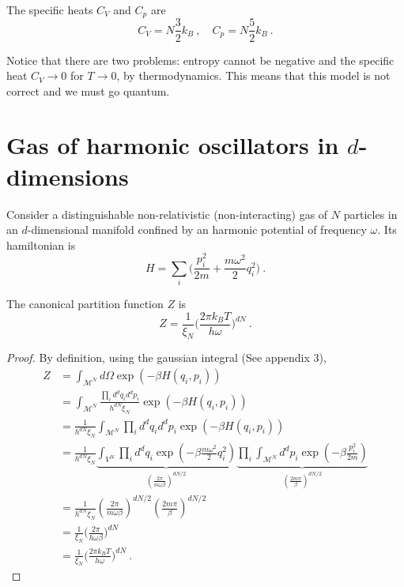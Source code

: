     The specific heats $C_V$ and $C_p$ are 
    \begin{equation*}
        C_V = N \frac{3}{2} k_B ~, \quad C_p = N \frac{5}{2} k_B ~. 
    \end{equation*}

    Notice that there are two problems: entropy cannot be negative and the specific heat $C_V \rightarrow 0$ for $T \rightarrow 0$, by thermodynamics. This means that this model is not correct and we must go quantum.
    
\section{Gas of harmonic oscillators in $d$-dimensions}

    Consider a distinguishable non-relativistic (non-interacting) gas of $N$ particles in an $d$-dimensional manifold confined by an harmonic potential of frequency $\omega$. Its hamiltonian is 
    \begin{equation*}
        H = \sum_i \Big ( \frac{p^2_i}{2m} + \frac{m \omega^2}{2} q_i^2 \Big ) ~.
    \end{equation*}

    The canonical partition function $Z$ is 
    \begin{equation*}
        Z = \frac{1}{\xi_N} \Big (\frac{2 \pi k_B T}{h \omega})^{dN} ~.
    \end{equation*}
    \begin{proof}
        By definition, using the gaussian integral (See appendix 3),
        \begin{equation*}
        \begin{aligned}
            Z & = \int_{\mathcal M^N} d\Omega \exp(- \beta H (q_i, p_i)) \\ & = \int_{\mathcal M^N} \frac{\prod_i d^d q_i d^d p_i}{h^{dN} \xi_N} \exp(- \beta H (q_i, p_i)) \\ & = \frac{1}{h^{dN} \xi_N} \int_{\mathcal M^N} \prod_i d^d q_i d^d p_i \exp(- \beta H (q_i, p_i)) \\ & = \frac{1}{h^{dN} \xi_N} \underbrace{\int_{ V^N} \prod_i d^d q_i \exp(- \beta \frac{m \omega^2}{2} q_i^2)}_{(\frac{2 \pi}{m \omega \beta})^{dN/2}} \underbrace{\prod_i \int_{\mathcal M^N} d^d p_i \exp(- \beta \frac{p^2_i}{2m})}_{(\frac{2 m \pi}{\beta})^{dN/2}} \\ & = \frac{1}{h^{dN} \xi_N} (\frac{2 \pi}{m \omega \beta})^{dN/2} (\frac{2 m \pi}{\beta})^{dN/2} \\ & = \frac{1}{\xi_N} \Big (\frac{2\pi}{h \omega \beta} \Big )^{dN} \\ & = \frac{1}{\xi_N} \Big (\frac{2 \pi k_B T}{h \omega} \Big )^{dN} ~.
        \end{aligned}
        \end{equation*}
    \end{proof}


